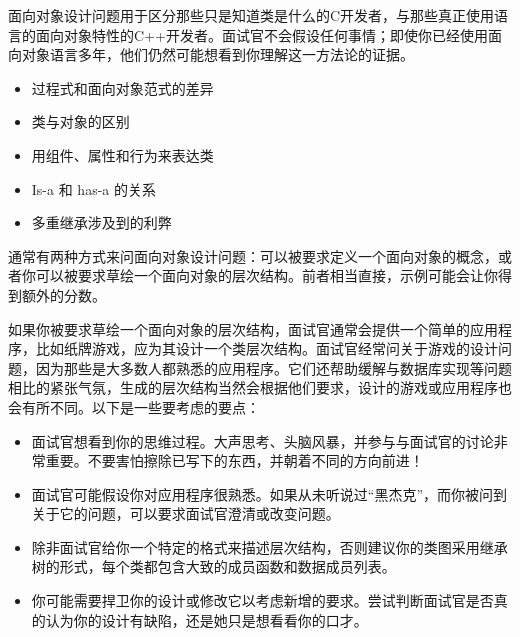 
面向对象设计问题用于区分那些只是知道类是什么的C开发者，与那些真正使用语言的面向对象特性的C++开发者。面试官不会假设任何事情；即使你已经使用面向对象语言多年，他们仍然可能想看到你理解这一方法论的证据。


\begin{itemize}
\item
过程式和面向对象范式的差异

\item
类与对象的区别

\item
用组件、属性和行为来表达类

\item
Is-a 和 has-a 的关系

\item
多重继承涉及到的利弊
\end{itemize}


通常有两种方式来问面向对象设计问题：可以被要求定义一个面向对象的概念，或者你可以被要求草绘一个面向对象的层次结构。前者相当直接，示例可能会让你得到额外的分数。

如果你被要求草绘一个面向对象的层次结构，面试官通常会提供一个简单的应用程序，比如纸牌游戏，应为其设计一个类层次结构。面试官经常问关于游戏的设计问题，因为那些是大多数人都熟悉的应用程序。它们还帮助缓解与数据库实现等问题相比的紧张气氛，生成的层次结构当然会根据他们要求，设计的游戏或应用程序也会有所不同。以下是一些要考虑的要点：

\begin{itemize}
\item
面试官想看到你的思维过程。大声思考、头脑风暴，并参与与面试官的讨论非常重要。不要害怕擦除已写下的东西，并朝着不同的方向前进！

\item
面试官可能假设你对应用程序很熟悉。如果从未听说过“黑杰克”，而你被问到关于它的问题，可以要求面试官澄清或改变问题。

\item
除非面试官给你一个特定的格式来描述层次结构，否则建议你的类图采用继承树的形式，每个类都包含大致的成员函数和数据成员列表。

\item
你可能需要捍卫你的设计或修改它以考虑新增的要求。尝试判断面试官是否真的认为你的设计有缺陷，还是她只是想看看你的口才。
\end{itemize}















